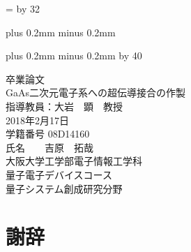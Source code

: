 \documentclass[a4paper,10pt,onecolumn,oneside,openany]{jsbook}
\def\linesparpage#1{\baselineskip=\textheight
   \divide\baselineskip by #1}
\def\kcharparline#1{
   \ifx\xkanjiskip\undefined

   \jintercharskip 0mm plus 0.2mm minus 0.2mm
   \else

   \xkanjiskip 0mm plus 0.2mm minus 0.2mm
   \fi
   \settowidth{\textwidth}{あ}
   \multiply\textwidth by #1}
\begin{document}
\linesparpage{32}
\kcharparline{40}


\begin{titlepage}
\begin{center}
{\huge 卒業論文 \\ }
\vspace*{150truept}
{\huge GaAs二次元電子系への超伝導接合の作製}\\
\vspace{100truept}
{\large 指導教員：大岩　顕　教授 \\ }
\vspace{30truept}
{\large 2018年2月17日}\\%
{\large 学籍番号 \hspace{15pt} 08D14160}\\
{\large 氏名　\hspace{15pt}　吉原　拓哉}\\
\vspace{100truept}
{\huge 大阪大学工学部電子情報工学科}\\
{\huge 量子電子デバイスコース}\\
{\huge 量子システム創成研究分野}\\
\end{center}
\end{titlepage}

\tableofcontents
\mainmatter

\makeatletter
\newcommand{\figcaption}[1]{\def\@captype{figure}\caption{#1}}
\newcommand{\tblcaption}[1]{\def\@captype{table}\caption{#1}}
\makeatother





\chapter*{謝辞}


\begin{thebibliography}{99}

\end{thebibliography}

\appendix

\newpage
\printindex
\end{document}
